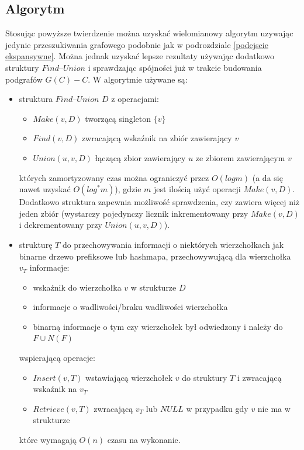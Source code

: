 \documentclass{pracamgr}
\begin{document}
   \subsection{Algorytm}
    Stosując powyższe twierdzenie można uzyskać wielomianowy algorytm uzywając jedynie przeszukiwania grafowego
    podobnie jak w podrozdziale \ref{podejscie ekspansywne}. Można jednak uzyskać lepsze rezultaty używając dodatkowo struktury $Find$--$Union$ i sprawdzając
    spójności już w trakcie budowania podgrafów $G(C)-C$.\newline
    W algorytmie używane są:
    \begin{itemize}
     \item struktura $Find$--$Union$ $D$ z operacjami:
      \begin{itemize}
       \item $Make(v,D)$ tworzącą singleton $\{v\}$
       \item $Find(v,D)$ zwracającą wskaźnik na zbiór zawierający $v$
       \item $Union(u,v,D)$ łączącą zbior zawierający $u$ ze zbiorem zawierającym $v$
      \end{itemize}
      których zamortyzowany czas można ograniczyć przez $O(log m)$ (a da się nawet uzyskać $O(log^*m)$), gdzie $m$ jest ilością użyć
      operacji $Make(v,D)$.
      Dodatkowo struktura zapewnia możliwość sprawdzenia, czy zawiera więcej niż jeden zbiór (wystarczy pojedynczy licznik inkrementowany przy
      $Make(v,D)$ i dekrementowany przy $Union(u,v,D)$).
     \item strukturę $T$ do przechowywania informacji o niektórych wierzchołkach jak binarne drzewo prefiksowe lub hashmapa,
      przechowywującą dla wierzchołka $v_T$ informacje:
      \begin{itemize}
       \item wskaźnik do wierzchołka $v$ w strukturze $D$
       \item informacje o wadliwości/braku wadliwości wierzchołka
       \item binarną informacje o tym czy wierzchołek był odwiedzony i należy do $F\cup N(F)$
      \end{itemize}
      wspierającą operacje:
      \begin{itemize}
       \item $Insert(v,T)$ wstawiającą wierzchołek $v$ do struktury $T$ i zwracającą wskaźnik na $v_T$
       \item $Retrieve(v,T)$ zwracającą $v_T$ lub $NULL$ w przypadku gdy $v$ nie ma w strukturze
      \end{itemize}
      które wymagają $O(n)$ czasu na wykonanie.
    \end{itemize}
    
\end{document}
